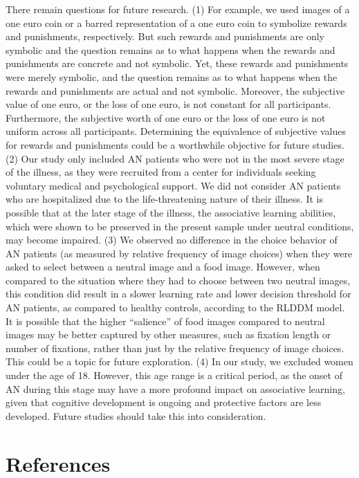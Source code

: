 \documentclass[
  man,floatsintext]{apa6}
\begin{document}
There remain questions for future research. (1) For example, we used images of a one euro coin or a barred representation of a one euro coin to symbolize rewards and punishments, respectively. But such rewards and punishments are only symbolic and the question remains as to what happens when the rewards and punishments are concrete and not symbolic. Yet, these rewards and punishments were merely symbolic, and the question remains as to what happens when the rewards and punishments are actual and not symbolic. Moreover, the subjective value of one euro, or the loss of one euro, is not constant for all participants. Furthermore, the subjective worth of one euro or the loss of one euro is not uniform across all participants. Determining the equivalence of subjective values for rewards and punishments could be a worthwhile objective for future studies. (2) Our study only included AN patients who were not in the most severe stage of the illness, as they were recruited from a center for individuals seeking voluntary medical and psychological support. We did not consider AN patients who are hospitalized due to the life-threatening nature of their illness. It is possible that at the later stage of the illness, the associative learning abilities, which were shown to be preserved in the present sample under neutral conditions, may become impaired. (3) We observed no difference in the choice behavior of AN patients (as measured by relative frequency of image choices) when they were asked to select between a neutral image and a food image. However, when compared to the situation where they had to choose between two neutral images, this condition did result in a slower learning rate and lower decision threshold for AN patients, as compared to healthy controls, according to the RLDDM model. It is possible that the higher ``salience'' of food images compared to neutral images may be better captured by other measures, such as fixation length or number of fixations, rather than just by the relative frequency of image choices. This could be a topic for future exploration. (4) In our study, we excluded women under the age of 18. However, this age range is a critical period, as the onset of AN during this stage may have a more profound impact on associative learning, given that cognitive development is ongoing and protective factors are less developed. Future studies should take this into consideration.

\newpage

\hypertarget{references}{%
\section{References}\label{references}}
\end{document}
